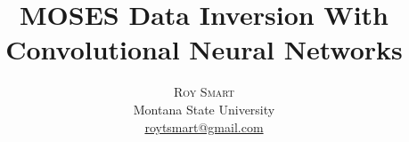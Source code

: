 \documentclass[twoside]{article}
\title{\vspace{-15mm}\fontsize{24pt}{10pt}\selectfont\textbf{MOSES Data Inversion With Convolutional Neural Networks}} %
\author{
\large
\textsc{Roy Smart}\\[2mm] %
\normalsize Montana State University \\ %
\normalsize \href{mailto:roy.smart@montana.edu}{roytsmart@gmail.com} %
\vspace{-5mm}
}
\date{}
\begin{document}
\maketitle %

\thispagestyle{fancy} %



\begin{multicols}{2} %


\end{multicols}
\end{document}
